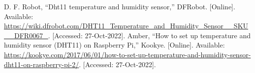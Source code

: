 \begin{thebibliography}{00}
     D. F.  Robot, “Dht11 temperature and humidity sensor,” DFRobot. [Online]. Available: \url{https://wiki.dfrobot.com/DHT11_Temperature_and_Humidity_Sensor__SKU__DFR0067_}. [Accessed: 27-Oct-2022]. 
     Amber, “How to set up temperature and humidity sensor (DHT11) on Raspberry Pi,” Kookye. [Online]. Available: \url{https://kookye.com/2017/06/01/how-to-set-up-temperature-and-humidity-sensor-dht11-on-raspberry-pi-2/}. [Accessed: 27-Oct-2022]. 
\end{thebibliography}
